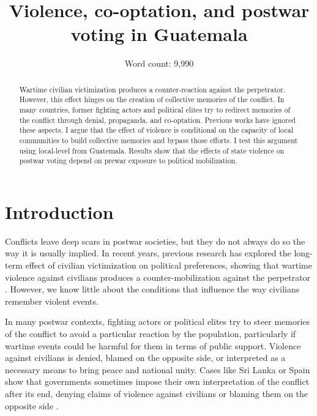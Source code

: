 \documentclass[12pt, notitlepage]{article}
\title{\Large Violence, co-optation, and postwar voting in Guatemala}
\author{}%
\date{Word count: 9,990}
\begin{document}
\maketitle
\thispagestyle{empty}

\vspace{30pt}

\begin{abstract}

Wartime civilian victimization produces a counter-reaction against the perpetrator. However, this effect hinges on the creation of collective memories of the conflict. In many countries, former fighting actors and political elites try to redirect memories of the conflict through denial, propaganda, and co-optation. Previous works have ignored these aspects. I argue that the effect of violence is conditional on the capacity of local communities to build collective memories and bypass those efforts. I test this argument using local-level from Guatemala. Results show that the effects of state violence on postwar voting depend on prewar exposure to political mobilization.

\end{abstract}

\newpage
\setcounter{page}{1}

\section*{Introduction}

Conflicts leave deep scars in postwar societies, but they do not always do so the way it is usually implied.
In recent years, previous research has explored the long-term effect of civilian victimization on political preferences, showing that wartime violence against civilians produces a counter-mobilization against the perpetrator \citep{Balcells:2012aa, Lupu:2017aa, Fontana:2017aa, Rozenas:2017aa, Rozenas:2019aa}.
However, we know little about the conditions that influence the way civilians remember violent events.

In many postwar contexts, fighting actors or political elites try to steer memories of the conflict to avoid a particular reaction by the population, particularly if wartime events could be harmful for them in terms of public support.
Violence against civilians is denied, blamed on the opposite side, or interpreted as a necessary means to bring peace and national unity.
Cases like Sri Lanka or Spain show that governments sometimes impose their own interpretation of the conflict after its end, denying claims of violence against civilians or blaming them on the opposite side \citep{Seoighe:2017aa, Palomares:2004aa}.
\end{document}
